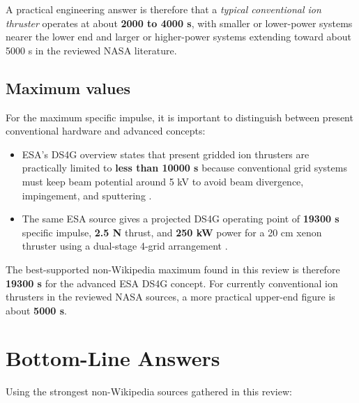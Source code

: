 \documentclass[11pt]{article}
\begin{document}
A practical engineering answer is therefore that a \emph{typical conventional ion thruster} operates at about \textbf{2000 to 4000 s}, with smaller or lower-power systems nearer the lower end and larger or higher-power systems extending toward about 5000 s in the reviewed NASA literature.

\subsection{Maximum values}

For the maximum specific impulse, it is important to distinguish between present conventional hardware and advanced concepts:

\begin{itemize}
    \item ESA's DS4G overview states that present gridded ion thrusters are practically limited to \textbf{less than 10000 s} because conventional grid systems must keep beam potential around 5 kV to avoid beam divergence, impingement, and sputtering \cite{ds4goverview}.
    \item The same ESA source gives a projected DS4G operating point of \textbf{19300 s} specific impulse, \textbf{2.5 N} thrust, and \textbf{250 kW} power for a 20 cm xenon thruster using a dual-stage 4-grid arrangement \cite{ds4goverview}.
\end{itemize}

The best-supported non-Wikipedia maximum found in this review is therefore \textbf{19300 s} for the advanced ESA DS4G concept. For currently conventional ion thrusters in the reviewed NASA sources, a more practical upper-end figure is about \textbf{5000 s}.

\section{Bottom-Line Answers}

Using the strongest non-Wikipedia sources gathered in this review:
\end{document}
